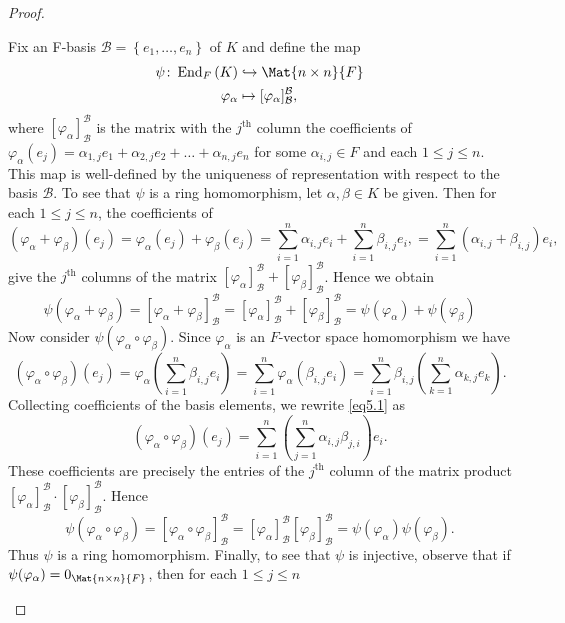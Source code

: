 \documentclass[10pt]{amsart}
\begin{document}
\begin{thm}
\begin{proof}
\begin{enumerate}[(a)]
Fix an F-basis $\mathcal{B} = \left\{e_1, \ldots, e_n\right\}$ of $K$ and define the map 
\begin{align*}
  \psi \colon \End{F}{K} &\hookrightarrow \Mat{n \times n}{F}\\
\varphi_\alpha &\mapsto [\varphi_\alpha]_{\mathcal{B}}^{\mathcal{B}},
\end{align*}
where $[\varphi_\alpha]_{\mathcal{B}}^{\mathcal{B}}$ is the matrix with the $j^{\text{th}}$ column the coefficients of $\varphi_\alpha(e_j) = \alpha_{1,j}e_1 + \alpha_{2,j}e_2 + \ldots + \alpha_{n,j}e_n$ for some $\alpha_{i,j} \in F$ and each $1 \leq j \leq n$.
This map is well-defined by the uniqueness of representation with respect to the basis $\mathcal{B}$.
To see that $\psi$ is a ring homomorphism, let $\alpha, \beta \in K$ be given.
Then for each $1 \leq j \leq n$, the coefficients of $$(\varphi_\alpha + \varphi_\beta)(e_j) = \varphi_\alpha(e_j) + \varphi_\beta(e_j) = \sum_{i=1}^n \alpha_{i,j}e_i + \sum_{i=1}^n\beta_{i,j}e_i,  = \sum_{i=1}^n (\alpha_{i,j} + \beta_{i,j})e_i,$$ 
give the $j^{\text{th}}$ columns of the matrix $[\varphi_{\alpha}]_{\mathcal{B}}^\mathcal{B} + [\varphi_\beta]_{\mathcal{B}}^\mathcal{B}$.
Hence we obtain
$$\psi(\varphi_\alpha + \varphi_\beta) = [\varphi_{\alpha} + \varphi_\beta]_{\mathcal{B}}^\mathcal{B} = [\varphi_\alpha]_{\mathcal{B}}^\mathcal{B} + [\varphi_\beta]_{\mathcal{B}}^\mathcal{B} = \psi(\varphi_\alpha) + \psi(\varphi_\beta)$$
Now consider $\psi(\varphi_\alpha \circ \varphi_\beta)$.
Since $\varphi_\alpha$ is an $F$-vector space homomorphism we have 
\begin{equation}\label{eq5.1}
  (\varphi_\alpha \circ \varphi_\beta)(e_j) = \varphi_\alpha\left(\sum_{i=1}^n\beta_{i,j}e_i\right) = \sum_{i=1}^n\varphi_\alpha\left(\beta_{i,j}e_i\right) = \sum_{i=1}^n\beta_{i,j}\left(\sum_{k=1}^n\alpha_{k,j}e_k\right).
\end{equation}
Collecting coefficients of the basis elements, we rewrite \eqref{eq5.1} as
$$(\varphi_\alpha \circ \varphi_\beta)(e_j) = \sum_{i=1}^n\left(\sum_{j=1}^n\alpha_{i,j}\beta_{j,i}\right)e_i.$$
These coefficients are precisely the entries of the $j^{\text{th}}$ column of the matrix product $[\varphi_\alpha]_{\mathcal{B}}^\mathcal{B} \cdot [\varphi_\beta]_{\mathcal{B}}^\mathcal{B}$.
Hence 
$$\psi(\varphi_\alpha \circ \varphi_\beta) = [\varphi_{\alpha} \circ \varphi_\beta]_{\mathcal{B}}^\mathcal{B} = [\varphi_\alpha]_{\mathcal{B}}^\mathcal{B}[\varphi_\beta]_{\mathcal{B}}^\mathcal{B} = \psi(\varphi_\alpha) \psi(\varphi_\beta).$$
Thus $\psi$ is a ring homomorphism.
Finally, to see that $\psi$ is injective, observe that if $\psi(\varphi_\alpha) = 0_{\Mat{n \times n}{F}}$, then for each $1 \leq j \leq n$

\end{enumerate}
\end{proof}
\end{thm}
\end{document}
